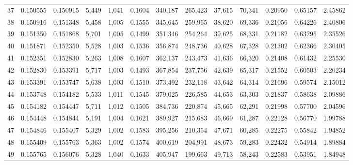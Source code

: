 \begin{tabular}{rrrrrrrrrrrrr}
37  &  0.150555 &  0.150915 &   5,449 &  1,041 &                                     0.1604 &  340,187 &  265,423 &   37,615 &   70,341 &  0.20950 &  0.65157 &  2.45862 \\
38  &  0.150916 &  0.151348 &   5,458 &  1,005 &                                     0.1555 &  345,645 &  259,965 &   38,620 &   69,336 &  0.21056 &  0.64226 &  2.40806 \\
39  &  0.151350 &  0.151868 &   5,701 &  1,005 &                                     0.1499 &  351,346 &  254,264 &   39,625 &   68,331 &  0.21182 &  0.63295 &  2.35526 \\
40  &  0.151871 &  0.152350 &   5,528 &  1,003 &                                     0.1536 &  356,874 &  248,736 &   40,628 &   67,328 &  0.21302 &  0.62366 &  2.30405 \\
41  &  0.152351 &  0.152830 &   5,263 &  1,008 &                                     0.1607 &  362,137 &  243,473 &   41,636 &   66,320 &  0.21408 &  0.61432 &  2.25530 \\
42  &  0.152830 &  0.153391 &   5,717 &  1,003 &                                     0.1493 &  367,854 &  237,756 &   42,639 &   65,317 &  0.21552 &  0.60503 &  2.20234 \\
43  &  0.153391 &  0.153747 &   5,638 &  1,003 &                                     0.1510 &  373,492 &  232,118 &   43,642 &   64,314 &  0.21696 &  0.59574 &  2.15012 \\
44  &  0.153748 &  0.154182 &   5,533 &  1,011 &                                     0.1545 &  379,025 &  226,585 &   44,653 &   63,303 &  0.21837 &  0.58638 &  2.09886 \\
45  &  0.154182 &  0.154447 &   5,711 &  1,012 &                                     0.1505 &  384,736 &  220,874 &   45,665 &   62,291 &  0.21998 &  0.57700 &  2.04596 \\
46  &  0.154448 &  0.154844 &   5,191 &  1,004 &                                     0.1621 &  389,927 &  215,683 &   46,669 &   61,287 &  0.22128 &  0.56770 &  1.99788 \\
47  &  0.154846 &  0.155407 &   5,329 &  1,002 &                                     0.1583 &  395,256 &  210,354 &   47,671 &   60,285 &  0.22275 &  0.55842 &  1.94852 \\
48  &  0.155409 &  0.155763 &   5,363 &  1,002 &                                     0.1574 &  400,619 &  204,991 &   48,673 &   59,283 &  0.22432 &  0.54914 &  1.89884 \\
49  &  0.155765 &  0.156076 &   5,328 &  1,040 &                                     0.1633 &  405,947 &  199,663 &   49,713 &   58,243 &  0.22583 &  0.53951 &  1.84948 \\

\end{tabular}
